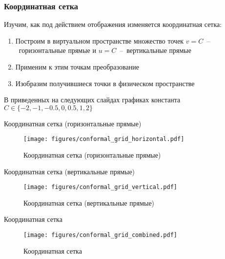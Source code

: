\begin{frame}\frametitle{Координатная сетка}
	Изучим, как под действием отображения изменяется координатная сетка:
	\begin{enumerate}
		\item Построим в виртуальном пространстве множество точек
		      \(v = C\)~--~горизонтальные прямые и \(u = C\)~--~вертикальные прямые
		\item Применим к этим точкам преобразование
		\item Изобразим получившиеся точки в физическом пространстве
	\end{enumerate}

	В приведенных на следующих слайдах графиках константа \(C \in \{-2, -1, -0.5, 0, 0.5, 1, 2\}\)
\end{frame}

\begin{frame}{Координатная сетка (горизонтальные прямые)}
	\begin{figure}
		\centering
		\texttt{[image: figures/conformal\_grid\_horizontal.pdf]}
		\caption{Координатная сетка (горизонтальные прямые)}\label{fig:conformal_grid_horizontal}
	\end{figure}
\end{frame}

\begin{frame}{Координатная сетка (вертикальные прямые)}
	\begin{figure}
		\centering
		\texttt{[image: figures/conformal\_grid\_vertical.pdf]}
		\caption{Координатная сетка (вертикальные прямые)}\label{fig:conformal_grid_vertical}
	\end{figure}
\end{frame}


\begin{frame}{Координатная сетка}
	\begin{figure}
		\centering
		\texttt{[image: figures/conformal\_grid\_combined.pdf]}
		\caption{Координатная сетка}\label{fig:conformal_grid}
	\end{figure}
\end{frame}
